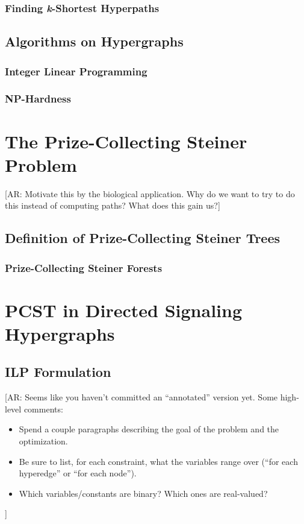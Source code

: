 \documentclass[12pt,twoside]{reedthesis}
\newcommand{\anna}[1]{{\color{blue}[AR: #1]}}
\begin{document}
\subsection{Finding \textit{k}-Shortest Hyperpaths}

\section{Algorithms on Hypergraphs}

\subsection{Integer Linear Programming}

\subsection{NP-Hardness}

	\chapter{The Prize-Collecting Steiner Problem}
	
	\anna{Motivate this by the biological application.  Why do we want to try to do this instead of computing paths?  What does this gain us?}
	
\section{Definition of Prize-Collecting Steiner Trees}

\subsection{Prize-Collecting Steiner Forests}


\chapter{PCST in Directed Signaling Hypergraphs}

\section{ILP Formulation}

\anna{Seems like you haven't committed an ``annotated'' version yet.  Some high-level comments:
\begin{itemize}
\item Spend a couple paragraphs describing the goal of the problem and the optimization.  
\item Be sure to list, for each constraint, what the variables range over (``for each hyperedge'' or ``for each node'').
\item Which variables/constants are binary? Which ones are real-valued?
\end{itemize}
}
\end{document}
